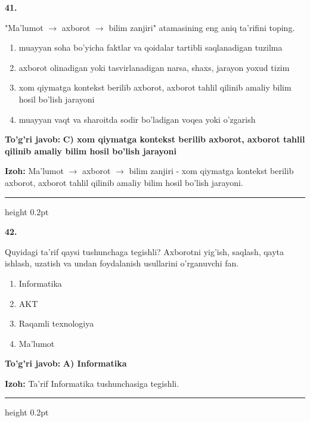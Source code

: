 \documentclass[10pt,a4paper,oneside]{article}
\begin{document}
\noindent\textbf{\color{ink}41.}
\par
"Ma'lumot \ensuremath{\to} axborot \ensuremath{\to} bilim zanjiri" atamasining eng aniq ta'rifini toping.
\begin{enumerate}[label=\Alph*),leftmargin=9mm]
\item muayyan soha bo'yicha faktlar va qoidalar tartibli saqlanadigan tuzilma
\item axborot olinadigan yoki tasvirlanadigan narsa, shaxs, jarayon yoxud tizim
\item xom qiymatga kontekst berilib axborot, axborot tahlil qilinib amaliy bilim hosil bo'lish jarayoni
\item muayyan vaqt va sharoitda sodir bo'ladigan voqea yoki o'zgarish
\end{enumerate}
\begin{tcolorbox}[enhanced,breakable,colback=teal!4,colframe=teal!50!black,boxrule=0.5pt,arc=1.1mm,left=3mm,right=3mm,top=1.7mm,bottom=1.7mm,before skip=2mm,after skip=2mm]
\textbf{\color{teal}To'g'ri javob:} \textbf{C) xom qiymatga kontekst berilib axborot, axborot tahlil qilinib amaliy bilim hosil bo'lish jarayoni}
\par\smallskip
\textbf{Izoh:} Ma'lumot \ensuremath{\to} axborot \ensuremath{\to} bilim zanjiri - xom qiymatga kontekst berilib axborot, axborot tahlil qilinib amaliy bilim hosil bo'lish jarayoni.
\end{tcolorbox}
\vspace{2mm}\hrule height 0.2pt \vspace{3mm}

\noindent\textbf{\color{ink}42.}
\par
Quyidagi ta'rif qaysi tushunchaga tegishli? Axborotni yig'ish, saqlash, qayta ishlash, uzatish va undan foydalanish usullarini o'rganuvchi fan.
\begin{enumerate}[label=\Alph*),leftmargin=9mm]
\item Informatika
\item AKT
\item Raqamli texnologiya
\item Ma'lumot
\end{enumerate}
\begin{tcolorbox}[enhanced,breakable,colback=teal!4,colframe=teal!50!black,boxrule=0.5pt,arc=1.1mm,left=3mm,right=3mm,top=1.7mm,bottom=1.7mm,before skip=2mm,after skip=2mm]
\textbf{\color{teal}To'g'ri javob:} \textbf{A) Informatika}
\par\smallskip
\textbf{Izoh:} Ta'rif Informatika tushunchasiga tegishli.
\end{tcolorbox}
\vspace{2mm}\hrule height 0.2pt \vspace{3mm}
\end{document}
